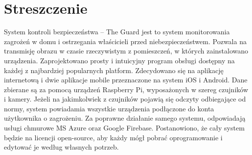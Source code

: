 \chapter{Streszczenie}
System kontroli bezpieczeństwa – The Guard jest to system monitorowania zagrożeń w domu i ostrzegania właścicieli przed niebezpieczeństwem. Pozwala na transmisję obrazu w czasie rzeczywistym z pomieszczeń, w których zainstalowano urządzenia. 
Zaprojektowano prosty i intuicyjny program obsługi dostępny na każdej z najbardziej popularnych platform. Zdecydowano się na aplikację internetową i dwie aplikacje mobile przeznaczone na system iOS i Android. Dane zbierane są za pomocą urządzeń Raspberry Pi, wyposażonych w szereg czujników i kamery. Jeżeli na jakimkolwiek z czujników pojawią się odczyty odbiegające od normy, system powiadamia wszystkie urządzenia podłączone do konta użytkownika o zagrożeniu. Za poprawne działanie samego systemu, odpowiadają usługi chmurowe MS Azure oraz Google Firebase. Postanowiono, że cały system będzie na licencji open-source, aby każdy mógł pobrać oprogramowanie i edytować je według własnych potrzeb.

